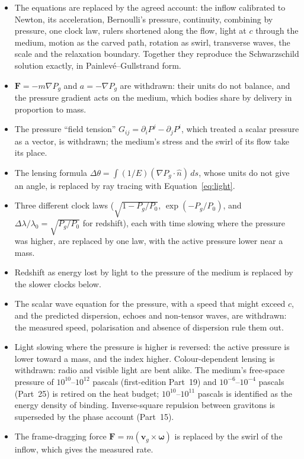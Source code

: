 \documentclass[11pt,a4paper]{article}
\begin{document}
\begin{itemize}
\item The equations are replaced by the agreed account: the inflow calibrated to Newton, its acceleration, Bernoulli's pressure, continuity, combining by pressure, one clock law, rulers shortened along the flow, light at $c$ through the medium, motion as the carved path, rotation as swirl, transverse waves, the scale and the relaxation boundary. Together they reproduce the Schwarzschild solution exactly, in Painlevé--Gullstrand form.
\item $\mathbf{F} = -m\nabla P_g$ and $a = -\nabla P_g$ are withdrawn: their units do not balance, and the pressure gradient acts on the medium, which bodies share by delivery in proportion to mass.
\item The pressure ``field tension'' $G_{ij} = \partial_i P^j - \partial_j P^i$, which treated a scalar pressure as a vector, is withdrawn; the medium's stress and the swirl of its flow take its place.
\item The lensing formula $\Delta\theta = \int (1/E)(\nabla P_g\cdot\hat n)\,ds$, whose units do not give an angle, is replaced by ray tracing with Equation~\eqref{eq:light}.
\item Three different clock laws ($\sqrt{1-P_g/P_0}$, $\exp(-P_g/P_0)$, and $\Delta\lambda/\lambda_0 = \sqrt{P_g/P_0}$ for redshift), each with time slowing where the pressure was higher, are replaced by one law, with the active pressure lower near a mass.
\item Redshift as energy lost by light to the pressure of the medium is replaced by the slower clocks below.
\item The scalar wave equation for the pressure, with a speed that might exceed $c$, and the predicted dispersion, echoes and non-tensor waves, are withdrawn: the measured speed, polarisation and absence of dispersion rule them out.
\item Light slowing where the pressure is higher is reversed: the active pressure is lower toward a mass, and the index higher. Colour-dependent lensing is withdrawn: radio and visible light are bent alike. The medium's free-space pressure of $10^{10}$--$10^{12}$ pascals (first-edition Part~19) and $10^{-6}$--$10^{-4}$ pascals (Part~25) is retired on the heat budget; $10^{10}$--$10^{11}$ pascals is identified as the energy density of binding. Inverse-square repulsion between gravitons is superseded by the phase account (Part~15).
\item The frame-dragging force $\mathbf{F} = m(\mathbf{v}_g\times\boldsymbol\omega)$ is replaced by the swirl of the inflow, which gives the measured rate.

\end{itemize}
\end{document}
